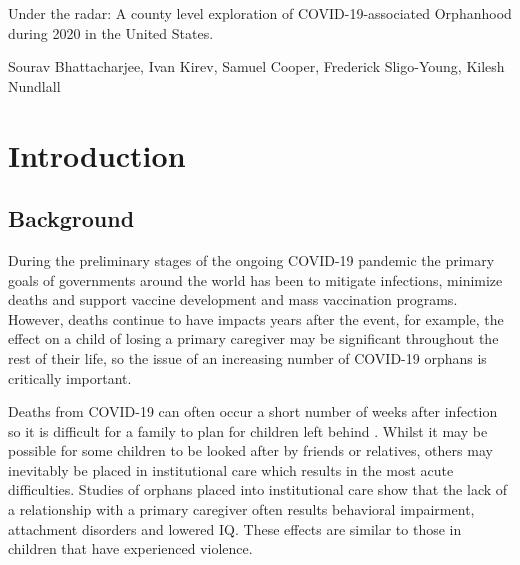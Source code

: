 \documentclass[11pt]{article}
\title{}
\author{Sourav Bhattacharjee, Ivan Kirev, Samuel Cooper , Frederick Sligo-Young, Kilesh Nundlall}
\date{16/06/2021}
\begin{document}
\begin{titlepage}
    \begin{center}
        \vspace*{6cm}
        \Huge
        {Under the radar: A county level exploration of COVID-19-associated Orphanhood during 2020 in the United States.}
    \end{center}
    \vspace{3cm}
    \large
    \begin{center}
        Sourav Bhattacharjee, Ivan Kirev, Samuel Cooper, Frederick Sligo-Young, Kilesh Nundlall
    \end{center}
\end{titlepage}
\doublespacing

\newpage



\tableofcontents

\newpage
\section{Introduction}

\subsection{Background}\label{s:background}

During the preliminary stages of the ongoing COVID-19 pandemic the primary goals of governments around the world has been to mitigate infections, minimize deaths and support vaccine development and mass vaccination programs.\cite{government_response} However, deaths continue to have impacts years after the event, for example, the effect on a child of losing a primary caregiver may be significant throughout the rest of their life, so the issue of an increasing number of COVID-19 orphans is critically important. 

Deaths from COVID-19 can often occur a short number of weeks after infection so it is difficult for a family to plan for children left behind \cite{global_study}. Whilst it may be possible for some children to be looked after by friends or relatives, others may inevitably be placed in institutional care which results in the most acute difficulties. Studies of orphans placed into institutional care show that the lack of a relationship with a primary caregiver often results behavioral impairment, attachment disorders and lowered IQ\cite{browne}. These effects are similar to those in children that have experienced violence\cite{johnson}. 
\end{document}
